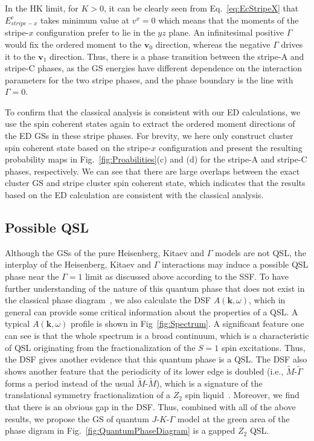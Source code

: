 \documentclass[aps,prb,reprint,amsfonts,amsmath,amssymb,showpacs,groupedaddress,superscriptaddress]{revtex4-1}
\begin{document}
In the HK limit, for $K>0$, it can be clearly seen from Eq.~\eqref{eq:EcStripeX} that $E_{stripe-x}^{c}$ takes minimum value at $v^x = 0$ which means that the moments of the stripe-$x$ configuration prefer to lie in the $yz$ plane. An infinitesimal positive $\Gamma$ would fix the ordered moment to the $\bm{v}_0$ direction, whereas the negative $\Gamma$ drives it to the $\bm{v}_1$ direction. Thus, there is a phase transition between the stripe-A and stripe-C phases, as the GS energies have different dependence on the interaction parameters for the two stripe phases, and the phase boundary is the line with $\Gamma=0$.

To confirm that the classical analysis is consistent with our ED calculations, we use the spin coherent states again to extract the ordered moment directions of the ED GSs in these stripe phases. For brevity, we here only construct cluster spin coherent state based on the stripe-$x$ configuration and present the resulting probability maps in Fig.~\ref{fig:Proabilities}(c) and (d) for the stripe-A and stripe-C phases, respectively. We can see that there are large overlaps between the exact cluster GS and stripe cluster spin coherent state, which indicates that the results based on the ED calculation are consistent with the classical analysis.

\subsection{\label{subsec:QSL}Possible QSL}

Although the GSs of the pure Heisenberg, Kitaev and $\Gamma$ models are not QSL, the interplay of the Heisenberg, Kitaev and $\Gamma$ interactions may induce a possible QSL phase near the $\Gamma=1$ limit as discussed above according to the SSF. To have further understanding of the nature of this quantum phase that does not exist in the classical phase diagram~\cite{PhysRevB.92.165108}, we also calculate the DSF $A(\mathbf{k}, \omega)$, which in general can provide some critical information about the properties of a QSL. A typical $A(\mathbf{k}, \omega)$ profile is shown in Fig~\ref{fig:Spectrum}. A significant feature one can see is that the whole spectrum is a broad continuum, which is a characteristic of QSL originating from the fractionalization of the $S=1$ spin excitations. Thus, the DSF gives another evidence that this quantum phase is a QSL. The DSF also shows another feature that the periodicity of its lower edge is doubled (i.e., $\tilde{M}$-$\tilde{\Gamma}$ forms a period instead of the usual $\tilde{M}$-$\tilde{M}$), which is a signature of the translational symmetry fractionalization of a $Z_{2}$ spin liquid~\cite{PhysRevB.90.121102,mei2015fractionalized,PhysRevB.99.205119}. Moreover, we find that there is an obvious gap in the DSF. Thus, combined with all of the above results, we propose the GS of quantum $J$-$K$-$\Gamma$ model at the green area of the phase digram in Fig.~\ref{fig:QuantumPhaseDiagram} is a gapped $Z_{2}$ QSL.
\end{document}
